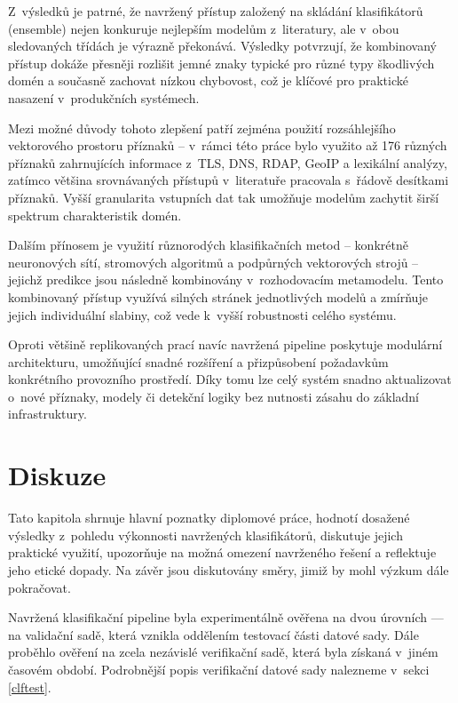 Z~výsledků je patrné, že navržený přístup založený na skládání klasifikátorů (ensemble) nejen konkuruje nejlepším modelům z~literatury, ale v~obou sledovaných třídách je výrazně překonává. Výsledky potvrzují, že kombinovaný přístup dokáže přesněji rozlišit jemné znaky typické pro různé typy škodlivých domén a současně zachovat nízkou chybovost, což je klíčové pro praktické nasazení v~produkčních systémech. 

Mezi možné důvody tohoto zlepšení patří zejména použití rozsáhlejšího vektorového prostoru příznaků – v~rámci této práce bylo využito až 176 různých příznaků zahrnujících informace z~TLS, DNS, RDAP, GeoIP a lexikální analýzy, zatímco většina srovnávaných přístupů v~literatuře pracovala s~řádově desítkami příznaků. Vyšší granularita vstupních dat tak umožňuje modelům zachytit širší spektrum charakteristik domén.

Dalším přínosem je využití různorodých klasifikačních metod – konkrétně neuronových sítí, stromových algoritmů a podpůrných vektorových strojů – jejichž predikce jsou následně kombinovány v~rozhodovacím metamodelu. Tento kombinovaný přístup využívá silných stránek jednotlivých modelů a zmírňuje jejich individuální slabiny, což vede k~vyšší robustnosti celého systému. 

Oproti většině replikovaných prací navíc navržená pipeline poskytuje modulární architekturu, umožňující snadné rozšíření a přizpůsobení požadavkům konkrétního provozního prostředí. Díky tomu lze celý systém snadno aktualizovat o~nové příznaky, modely či detekční logiky bez nutnosti zásahu do základní infrastruktury.


\chapter{Diskuze}
\label{chapter:discussion}\label{chapter:10}


Tato kapitola shrnuje hlavní poznatky diplomové práce, hodnotí dosažené výsledky z~pohledu výkonnosti navržených klasifikátorů, diskutuje jejich praktické využití, upozorňuje na možná omezení navrženého řešení a reflektuje jeho etické dopady. Na závěr jsou diskutovány směry, jimiž by mohl výzkum dále pokračovat.

Navržená klasifikační pipeline byla experimentálně ověřena na dvou úrovních — na validační sadě, která vznikla oddělením testovací části datové sady. Dále proběhlo ověření na zcela nezávislé verifikační sadě, která byla získaná v~jiném časovém období. Podrobnější popis verifikační datové sady nalezneme v~sekci \ref{clftest}.

